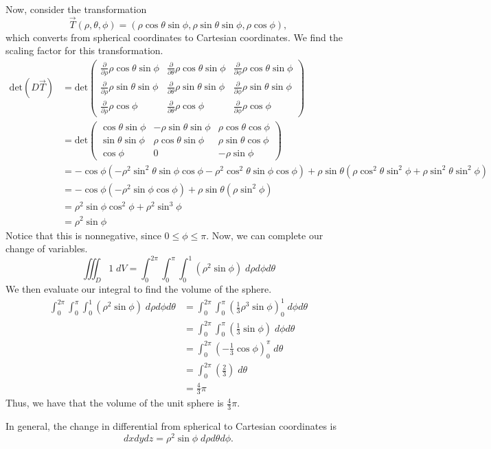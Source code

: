 \documentclass{ximera}
\begin{document}
\begin{example}
Now, consider the transformation
\[
\vec{T}(\rho,\theta,\phi) = (\rho\cos\theta\sin\phi, \rho\sin\theta\sin\phi,\rho\cos\phi),
\]
which converts from spherical coordinates to Cartesian coordinates. We find the scaling factor for this transformation.
\begin{align*}
\text{det}(D\vec{T}) &= \text{det}\begin{pmatrix}
\frac{\partial}{\partial \rho}\rho\cos\theta\sin\phi & \frac{\partial}{\partial \theta}\rho\cos\theta\sin\phi & \frac{\partial}{\partial \phi}\rho\cos\theta\sin\phi\\
\frac{\partial}{\partial \rho} \rho\sin\theta\sin\phi & \frac{\partial}{\partial \theta}\rho\sin\theta\sin\phi & \frac{\partial}{\partial \phi}\rho\sin\theta\sin\phi\\
\frac{\partial}{\partial \rho}\rho\cos\phi & \frac{\partial}{\partial \theta}\rho\cos\phi & \frac{\partial}{\partial \phi}\rho\cos\phi
\end{pmatrix}\\
&= \text{det}\begin{pmatrix}
\cos\theta\sin\phi & -\rho\sin\theta\sin\phi & \rho\cos\theta\cos\phi\\
\sin\theta\sin\phi & \rho\cos\theta\sin\phi & \rho\sin\theta\cos\phi\\
\cos\phi & 0 & -\rho\sin\phi
\end{pmatrix}\\
&= -\cos\phi\left(-\rho^2\sin^2\theta\sin\phi\cos\phi - \rho^2\cos^2\theta\sin\phi\cos\phi\right) + \rho\sin\theta\left(\rho\cos^2\theta\sin^2\phi + \rho\sin^2\theta\sin^2\phi\right)\\
&= -\cos\phi\left(-\rho^2\sin\phi\cos\phi\right) + \rho\sin\theta\left(\rho\sin^2\phi\right)\\
&= \rho^2\sin\phi\cos^2\phi + \rho^2\sin^3\phi\\
&= \rho^2\sin\phi
\end{align*}
Notice that this is nonnegative, since $0\leq \phi\leq \pi$. Now, we can complete our change of variables.
\[
\iiint_D 1\;dV = \int_0^{2\pi}\int_0^\pi\int_0^1 (\rho^2\sin\phi)\;d\rho d\phi d\theta
\]
We then evaluate our integral to find the volume of the sphere.
\begin{align*}
\int_0^{2\pi}\int_0^{\pi}\int_0^1 (\rho^2\sin\phi)\;d\rho d\phi d\theta &= \int_0^{2\pi}\int_0^{\pi}\left(\frac{1}{3}\rho^3\sin\phi\right)_0^1 \; d\phi d\theta\\
&= \int_0^{2\pi}\int_0^{\pi}\left(\frac{1}{3}\sin\phi\right)\; d\phi d\theta\\
&= \int_0^{2\pi}\left(-\frac{1}{3}\cos\phi\right)_0^{\pi}\; d\theta\\
&= \int_0^{2\pi}\left(\frac{2}{3}\right)\; d\theta\\
&= \frac{4}{3}\pi
\end{align*}
Thus, we have that the volume of the unit sphere is $\frac{4}{3}\pi$.
\end{example}

In general, the change in differential from spherical to Cartesian coordinates is
\[
dxdydz = \rho^2\sin\phi\;d\rho d\theta d\phi.
\]
\end{document}
